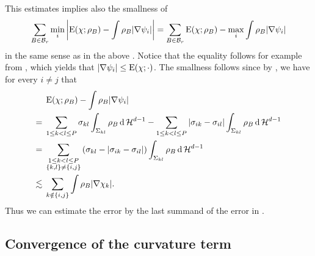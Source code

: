 \begin{remark}
	\label{localization_estimate_weaker}
This estimates implies also the smallness of
\begin{equation*}
	\sum_{ B \in \mathcal{ B }_{ r } }
		\min_{ i }
			\abs{
			\operatorname{E} ( \chi; \rho_{ B } )
			-
			\int
				\rho_{ B }
			\abs{ \nabla \psi_{ i } }
		}
	=
	\sum_{ B \in \mathcal{ B }_{ r } }
		\operatorname{E} ( \chi ; \rho_{ B } )
		-
		\max_{ i }
			\int
				\rho_{ B }
			\abs{ \nabla \psi_{ i } }
\end{equation*}
in the same sense as in the above . 
Notice that the equality follows for example from 
, which yields that $ \abs{ \nabla 
\psi_{ i } } \leq \operatorname{E} ( \chi ; \cdot )$. The smallness follows since by 
, we have for every $ i \neq j $ that
\begin{align*}
	&
	\operatorname{E} ( \chi ; \rho_{ B } ) 
	-
	\int
		\rho_{ B }
	\abs{ \nabla \psi_{ i } }
	\\
	={} &
	\sum_{ 1 \leq k < l \leq P }
		\sigma_{ k l }
		\int_{ \Sigma_{ k l } }
			\rho_{ B }
		\dd{ \operatorname{\mathcal{H}}^{ d -1 } }
	-
	\sum_{ 1 \leq k < l \leq P }
		\abs{ \sigma_{ i k } - \sigma_{ i l } }
		\int_{ \Sigma_{ k l } }
			\rho_{ B }
		\dd{ \operatorname{\mathcal{H}}^{ d - 1 } }
	\\
	={} &
	\sum_{ \substack{1 \leq k < l \leq P \\ \{ k, l \} \neq \{ i, j \} } }
		\left(
			\sigma_{ k l } - \abs{ \sigma_{ i k } - \sigma_{ i l } }
		\right)
		\int_{ \Sigma_{ k l } }
			\rho_{ B }
		\dd{ \operatorname{\mathcal{H}}^{ d - 1 } }
	\\
	\lesssim{} &
	\sum_{ k \notin \{ i, j \} }
		\int
			\rho_{ B }
		\abs{ \nabla \chi_{ k } }.
\end{align*}
Thus we can estimate the error by the last summand of the error in 
.
\end{remark}
\subsection{Convergence of the curvature term}

